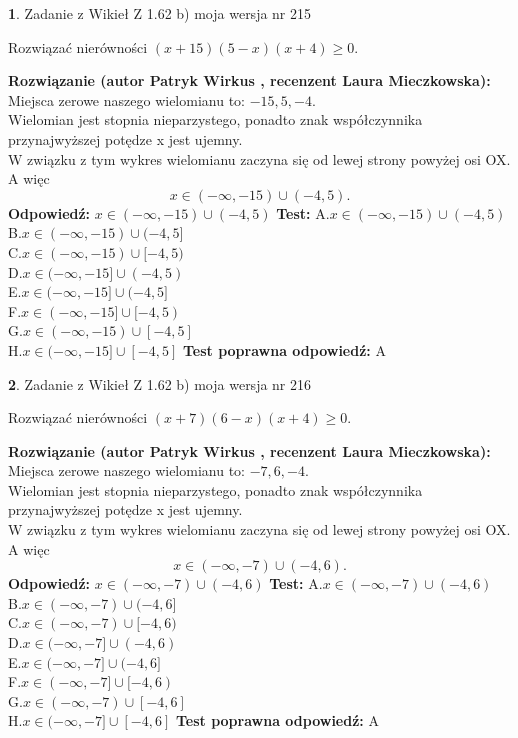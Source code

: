 \documentclass[12pt, a4paper]{article}
\theoremstyle{definition} %
\newtheorem{zad}{}
\newcommand{\zadStart}[1]{\begin{zad}#1\newline}
\newcommand{\zadStop}{\end{zad}}
\newcommand{\rozwStart}[2]{\noindent \textbf{Rozwiązanie (autor #1 , recenzent #2): }\newline}
\newcommand{\rozwStop}{\newline}
\newcommand{\odpStart}{\noindent \textbf{Odpowiedź:}\newline}
\newcommand{\odpStop}{\newline}
\newcommand{\testStart}{\noindent \textbf{Test:}\newline}
\newcommand{\testStop}{\newline}
\newcommand{\kluczStart}{\noindent \textbf{Test poprawna odpowiedź:}\newline}
\newcommand{\kluczStop}{\newline}
\begin{document}
\zadStart{Zadanie z Wikieł Z 1.62 b) moja wersja nr 215}

Rozwiązać nierówności $(x+15)(5-x)(x+4)\ge0$.
\zadStop
\rozwStart{Patryk Wirkus}{Laura Mieczkowska}
Miejsca zerowe naszego wielomianu to: $-15, 5, -4$.\\
Wielomian jest stopnia nieparzystego, ponadto znak współczynnika przy\linebreak najwyższej potędze x jest ujemny.\\ W związku z tym wykres wielomianu zaczyna się od lewej strony powyżej osi OX. A więc $$x \in (-\infty,-15) \cup (-4,5).$$
\rozwStop
\odpStart
$x \in (-\infty,-15) \cup (-4,5)$
\odpStop
\testStart
A.$x \in (-\infty,-15) \cup (-4,5)$\\
B.$x \in (-\infty,-15) \cup (-4,5]$\\
C.$x \in (-\infty,-15) \cup [-4,5)$\\
D.$x \in (-\infty,-15] \cup (-4,5)$\\
E.$x \in (-\infty,-15] \cup (-4,5]$\\
F.$x \in (-\infty,-15] \cup [-4,5)$\\
G.$x \in (-\infty,-15) \cup [-4,5]$\\
H.$x \in (-\infty,-15] \cup [-4,5]$
\testStop
\kluczStart
A
\kluczStop



\zadStart{Zadanie z Wikieł Z 1.62 b) moja wersja nr 216}

Rozwiązać nierówności $(x+7)(6-x)(x+4)\ge0$.
\zadStop
\rozwStart{Patryk Wirkus}{Laura Mieczkowska}
Miejsca zerowe naszego wielomianu to: $-7, 6, -4$.\\
Wielomian jest stopnia nieparzystego, ponadto znak współczynnika przy\linebreak najwyższej potędze x jest ujemny.\\ W związku z tym wykres wielomianu zaczyna się od lewej strony powyżej osi OX. A więc $$x \in (-\infty,-7) \cup (-4,6).$$
\rozwStop
\odpStart
$x \in (-\infty,-7) \cup (-4,6)$
\odpStop
\testStart
A.$x \in (-\infty,-7) \cup (-4,6)$\\
B.$x \in (-\infty,-7) \cup (-4,6]$\\
C.$x \in (-\infty,-7) \cup [-4,6)$\\
D.$x \in (-\infty,-7] \cup (-4,6)$\\
E.$x \in (-\infty,-7] \cup (-4,6]$\\
F.$x \in (-\infty,-7] \cup [-4,6)$\\
G.$x \in (-\infty,-7) \cup [-4,6]$\\
H.$x \in (-\infty,-7] \cup [-4,6]$
\testStop
\kluczStart
A
\kluczStop
\end{document}
